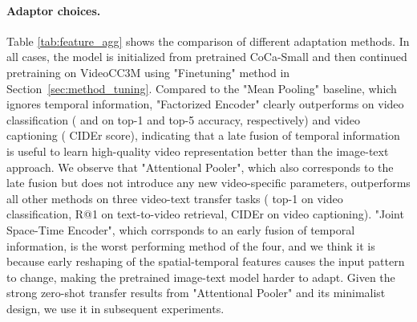 \paragraph{Adaptor choices.}
\label{sec:experiments_feature_agg_ablation}
Table \ref{tab:feature_agg} shows the comparison of different adaptation methods. In all cases, the model is initialized from pretrained CoCa-Small and then continued pretraining on VideoCC3M using "Finetuning" method in Section~\ref{sec:method_tuning}. Compared to the "Mean Pooling" baseline, which ignores temporal information, "Factorized Encoder" clearly outperforms on video classification ( and  on top-1 and top-5 accuracy, respectively) and video captioning ( CIDEr score), indicating that a late fusion of temporal information is useful to learn high-quality video representation better than the image-text approach. We observe that "Attentional Pooler", which also corresponds to the late fusion but does not introduce any new video-specific parameters, outperforms all other methods on three video-text transfer tasks ( top-1 on video classification,  R@1 on text-to-video retrieval,  CIDEr on video captioning). "Joint Space-Time Encoder", which corrsponds to an early fusion of temporal information, is the worst performing method of the four, and we think it is because early reshaping of the spatial-temporal features causes the input pattern to change, making the pretrained image-text model harder to adapt. Given the strong zero-shot transfer results from "Attentional Pooler" and its minimalist design, we use it in subsequent experiments.



